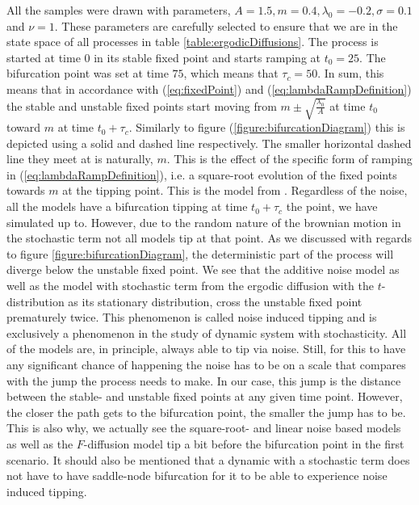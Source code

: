All the samples were drawn with parameters, $A = 1.5, m = 0.4, \lambda_0 = -0.2, \sigma = 0.1$ and $\nu = 1$. These parameters are carefully selected to ensure that we are in the state space of all processes in table \ref{table:ergodicDiffusions}. The process is started at time $0$ in its stable fixed point and starts ramping at $t_0 = 25$. The bifurcation point was set at time $75$, which means that $\tau_c = 50$. In sum, this means that in accordance with (\ref{eq:fixedPoint}) and (\ref{eq:lambdaRampDefinition}) the stable and unstable fixed points start moving from $m\pm\sqrt{\frac{\lambda_0}{A}}$ at time $t_0$ toward $m$ at time $t_0 + \tau_c$. Similarly to figure (\ref{figure:bifurcationDiagram}) this is depicted using a solid and dashed line respectively. The smaller horizontal dashed line they meet at is naturally, $m$. This is the effect of the specific form of ramping in (\ref{eq:lambdaRampDefinition}), i.e. a square-root evolution of the fixed points towards $m$ at the tipping point. This is the model from \cite{Ditlevsen2023}. Regardless of the noise, all the models have a bifurcation tipping at time $t_0+\tau_c$ the point, we have simulated up to. However, due to the random nature of the brownian motion in the stochastic term not all models tip at that point. As we discussed with regards to figure \ref{figure:bifurcationDiagram}, the deterministic part of the process will diverge below the unstable fixed point. We see that the additive noise model as well as the model with stochastic term from the ergodic diffusion with the $t$-distribution as its stationary distribution, cross the unstable fixed point prematurely twice. This phenomenon is called noise induced tipping and is exclusively a phenomenon in the study of dynamic system with stochasticity. All of the models are, in principle, always able to tip via noise. Still, for this to have any significant chance of happening the noise has to be on a scale that compares with the jump the process needs to make. In our case, this jump is the distance between the stable- and unstable fixed points at any given time point. However, the closer the path gets to the bifurcation point, the smaller the jump has to be. This is also why, we actually see the square-root- and linear noise based models as well as the $F$-diffusion model tip a bit before the bifurcation point in the first scenario.  It should also be mentioned that a dynamic with a stochastic term does not have to have saddle-node bifurcation for it to be able to experience noise induced tipping.\\
